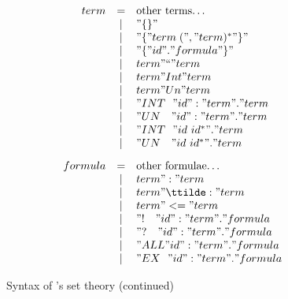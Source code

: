 \begin{figure}
\dquotes
\[\begin{array}{rcl}
    term & = & \hbox{other terms\ldots} \\
         & | & "\{\}" \\
         & | & "\{ " term\; ("," term)^* " \}" \\
         & | & "\{ " id " . " formula " \}" \\
         & | & term " `` " term \\
         & | & term " Int " term \\
         & | & term " Un " term \\
         & | & "INT~~"  id ":" term " . " term \\
         & | & "UN~~~"  id ":" term " . " term \\
         & | & "INT~~"  id~id^* " . " term \\
         & | & "UN~~~"  id~id^* " . " term \\[2ex]
 formula & = & \hbox{other formulae\ldots} \\
         & | & term " : " term \\
         & | & term " \ttilde: " term \\
         & | & term " <= " term \\
         & | & "!~~~" id ":" term " . " formula \\
         & | & "?~~~" id ":" term " . " formula \\
         & | & "ALL " id ":" term " . " formula \\
         & | & "EX~~" id ":" term " . " formula
  \end{array}
\]
\caption{Syntax of {\HOL}'s set theory (continued)} \label{hol-set-syntax2}
\end{figure} 


